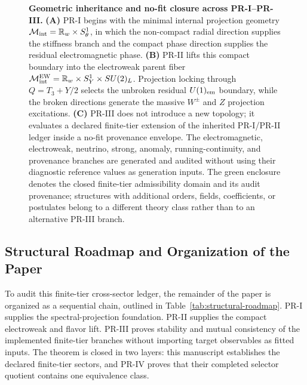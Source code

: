 \documentclass[11pt]{article}
\begin{document}
\begin{figure}[h]
{
}
\caption{\textbf{Geometric inheritance and no-fit closure across PR-I--PR-III.}
\textbf{(A)} PR-I begins with the minimal internal projection geometry
$\mathcal M_{\rm int}=\mathbb R_w\times S^1_\theta$, in which the non-compact
radial direction supplies the stiffness branch and the compact phase direction
supplies the residual electromagnetic phase.
\textbf{(B)} PR-II lifts this compact boundary into the electroweak parent fiber
$\mathcal M_{\rm int}^{\rm EW}=\mathbb R_w\times S_Y^1\times SU(2)_L$.
Projection locking through $Q=T_3+Y/2$ selects the unbroken residual
$U(1)_{\rm em}$ boundary, while the broken directions generate the massive
$W^\pm$ and $Z$ projection excitations.
\textbf{(C)} PR-III does not introduce a new topology; it evaluates a declared
finite-tier extension of the inherited PR-I/PR-II ledger inside a no-fit
provenance envelope. The electromagnetic,
electroweak, neutrino, strong, anomaly, running-continuity, and provenance
branches are generated and audited without using their diagnostic reference
values as generation inputs. The green enclosure denotes the closed
finite-tier admissibility domain and its audit provenance; structures with
additional orders, fields, coefficients, or postulates belong to a different
theory class rather than to an alternative PR-III branch.}
\label{fig:priii-geometric-inheritance-no-fit-closure}
\end{figure}

\subsection{Structural Roadmap and Organization of the Paper}
\label{subsec:priii-paper-organization}

To audit this finite-tier cross-sector ledger, the remainder of the paper is
organized as a sequential chain, outlined in
Table~\ref{tab:structural-roadmap}. PR-I supplies the spectral-projection
foundation. PR-II supplies the compact electroweak and flavor lift. PR-III
proves stability and mutual consistency of the implemented finite-tier branches
without importing target observables as fitted inputs.  The theorem is closed
in two layers: this manuscript establishes the declared finite-tier sectors,
and PR-IV proves that their completed selector quotient contains one
equivalence class.
\end{document}
